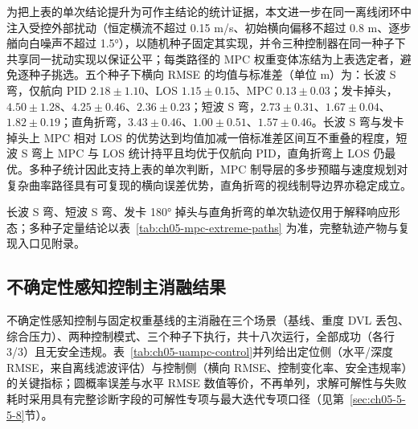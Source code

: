 为把上表的单次结论提升为可作主结论的统计证据，本文进一步在同一离线闭环中注入受控外部扰动（恒定横流不超过 0.15 m/s、初始横向偏移不超过 0.8 m、逐步艏向白噪声不超过 1.5°），以随机种子固定其实现，并令三种控制器在同一种子下共享同一扰动实现以保证公平；每类路径的 MPC 权重变体冻结为上表选定者，避免逐种子挑选。五个种子下横向 RMSE 的均值与标准差（单位 m）为：长波 S 弯，仅航向 PID $2.18\pm1.10$、LOS $1.15\pm0.15$、MPC $0.13\pm0.03$；发卡掉头，$4.50\pm1.28$、$4.25\pm0.46$、$2.36\pm0.23$；短波 S 弯，$2.73\pm0.31$、$1.67\pm0.04$、$1.82\pm0.19$；直角折弯，$3.43\pm0.46$、$1.00\pm0.51$、$1.57\pm0.46$。长波 S 弯与发卡掉头上 MPC 相对 LOS 的优势达到均值加减一倍标准差区间互不重叠的程度，短波 S 弯上 MPC 与 LOS 统计持平且均优于仅航向 PID，直角折弯上 LOS 仍最优。多种子统计因此支持上表的单次判断，MPC 制导层的多步预瞄与速度规划对复杂曲率路径具有可复现的横向误差优势，直角折弯的视线制导边界亦稳定成立。

长波 S 弯、短波 S 弯、发卡 180° 掉头与直角折弯的单次轨迹仅用于解释响应形态；多种子定量结论以表~\ref{tab:ch05-mpc-extreme-paths} 为准，完整轨迹产物与复现入口见附录。
\FloatBarrier

\subsection{不确定性感知控制主消融结果}\label{sec:ch05-5-5-6}\label{sec:ch05-5-5-7}

不确定性感知控制与固定权重基线的主消融在三个场景（基线、重度 DVL 丢包、综合压力）、两种控制模式、三个种子下执行，共十八次运行，全部成功（各行 3/3）且无安全违规。表~\ref{tab:ch05-uampc-control}并列给出定位侧（水平/深度 RMSE，来自离线滤波评估）与控制侧（横向 RMSE、控制变化率、安全违规率）的关键指标；圆概率误差与水平 RMSE 数值等价，不再单列，求解可解性与失败耗时采用具有完整诊断字段的可解性专项与最大迭代专项口径（见第~\ref{sec:ch05-5-5-8}节）。

